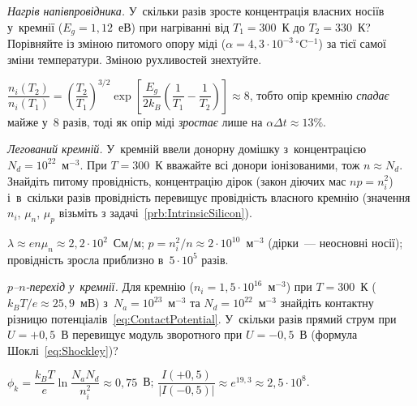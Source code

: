 \begin{problem}\label{prb:IntrinsicTemperature}
	\emph{Нагрів напівпровідника.} У~скільки разів зросте концентрація власних носіїв
	у~кремнії ($E_g=1{,}12$~еВ) при нагріванні від $T_1=300$~К до $T_2=330$~К? Порівняйте
	із зміною питомого опору міді ($\alpha=4{,}3\cdot10^{-3}\,{}^\circ$C$^{-1}$) за тієї
	самої зміни температури. Зміною рухливостей знехтуйте.
	\begin{solution}
		$\dfrac{n_i(T_2)}{n_i(T_1)}=\left(\dfrac{T_2}{T_1}\right)^{3/2}\exp\!\left[\dfrac{E_g}{2k_B}\left(\dfrac1{T_1}-\dfrac1{T_2}\right)\right]\approx8$,
		тобто опір кремнію \emph{спадає} майже у~$8$ разів, тоді як опір міді \emph{зростає} лише на $\alpha\Delta t\approx13\%$.
	\end{solution}
\end{problem}

\begin{problem}\label{prb:DopedSilicon}
	\emph{Легований кремній.} У~кремній ввели донорну домішку з~концентрацією
	$N_d=10^{22}$~м$^{-3}$. При $T=300$~К вважайте всі донори іонізованими, тож $n\approx
	N_d$. Знайдіть питому провідність, концентрацію дірок (закон діючих мас $np=n_i^2$)
	і~в~скільки разів провідність перевищує провідність власного кремнію (значення $n_i$,
	$\mu_n$, $\mu_p$ візьміть з задачі~\ref{prb:IntrinsicSilicon}).
	\begin{solution}
		$\lambda\approx en\mu_n\approx2{,}2\cdot10^{2}$~См/м; $p=n_i^2/n\approx2\cdot10^{10}$~м$^{-3}$ (дірки~--- неосновні носії);
		провідність зросла приблизно в~$5\cdot10^{5}$ разів.
	\end{solution}
\end{problem}

\begin{problem}\label{prb:PNJunction}
	\emph{$p$--$n$-перехід у~кремнії.} Для кремнію ($n_i=1{,}5\cdot10^{16}$~м$^{-3}$) при
	$T=300$~К ($k_BT/e\approx25{,}9$~мВ) з~$N_a=10^{23}$~м$^{-3}$ та
	$N_d=10^{22}$~м$^{-3}$ знайдіть контактну різницю
	потенціалів~\eqref{eq:ContactPotential}. У~скільки разів прямий струм при $U=+0{,}5$~В
	перевищує модуль зворотного при $U=-0{,}5$~В (формула Шоклі~\eqref{eq:Shockley})?
	\begin{solution}
		$\phi_k=\dfrac{k_BT}{e}\ln\dfrac{N_aN_d}{n_i^2}\approx0{,}75$~В; $\dfrac{I(+0{,}5)}{|I(-0{,}5)|}\approx e^{19{,}3}\approx2{,}5\cdot10^{8}$.
	\end{solution}
\end{problem}

